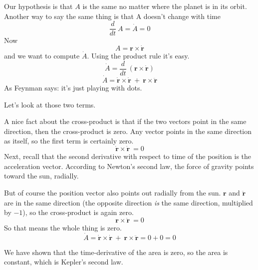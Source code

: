 \documentclass[11pt, oneside]{article}
\begin{document}
Our hypothesis is that $A$ is the same no matter where the planet is in its orbit.  Another way to say the same thing is that A doesn't change with time
\[ \frac{d}{dt} \ A = \dot A = 0 \]
Now 
\[ A = \mathbf{r} \times \dot{\mathbf{r}} \]
and we want to compute $\dot A$.  Using the product rule it's easy.
\[ \dot A = \frac{d}{dt} \ (\mathbf{r} \times \dot{\mathbf{r}}) \]
\[ \dot A = \dot{\mathbf{r}} \times \dot{\mathbf{r}} \ + \ \mathbf{r} \times \ddot{\mathbf{r}} \]
As Feynman says: it's just playing with dots.  

Let's look at those two terms.

A nice fact about the cross-product is that if the two vectors point in the same direction, then the cross-product is zero.  Any vector points in the same direction as itself, so the first term is certainly zero.  
\[ \dot{\mathbf{r}} \times \dot{\mathbf{r}} \ = 0 \]
Next, recall that the second derivative with respect to time of the position is the acceleration vector.  According to Newton's second law, the force of gravity points toward the sun, radially.  

But of course the position vector also points out radially from the sun.  $\mathbf{r}$ and $\ddot{\mathbf{r}}$ are in the same direction (the opposite direction \emph{is} the same direction, multiplied by $-1$), so the cross-product is again zero.
\[ \mathbf{r} \times \ddot{\mathbf{r}} \ = 0 \]
So that means the whole thing is zero.
\[ \dot A = \dot{\mathbf{r}} \times \dot{\mathbf{r}} \ + \ \mathbf{r} \times \ddot{\mathbf{r}} = 0 + 0 = 0  \]

We have shown that the time-derivative of the area is zero, so the area is constant, which is Kepler's second law.
\end{document}
